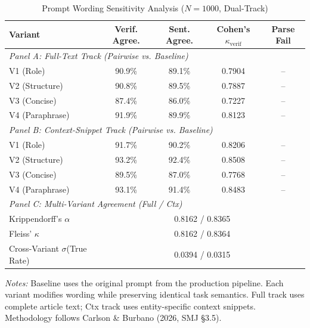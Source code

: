 \begin{table}[htbp]
\centering
\caption{Prompt Wording Sensitivity Analysis ($N=1000$, Dual-Track)}
\label{tab:prompt_sensitivity}
\begin{tabular}{lcccc}
\hline
Variant & Verif. Agree. & Sent. Agree. & Cohen's $\kappa_{\text{verif}}$ & Parse Fail \\
\hline
\multicolumn{5}{l}{\textit{Panel A: Full-Text Track (Pairwise vs. Baseline)}} \\
\quad V1 (Role) & 90.9\% & 89.1\% & 0.7904 & -- \\
\quad V2 (Structure) & 90.8\% & 89.5\% & 0.7887 & -- \\
\quad V3 (Concise) & 87.4\% & 86.0\% & 0.7227 & -- \\
\quad V4 (Paraphrase) & 91.9\% & 89.9\% & 0.8123 & -- \\
\hline
\multicolumn{5}{l}{\textit{Panel B: Context-Snippet Track (Pairwise vs. Baseline)}} \\
\quad V1 (Role) & 91.7\% & 90.2\% & 0.8206 & -- \\
\quad V2 (Structure) & 93.2\% & 92.4\% & 0.8508 & -- \\
\quad V3 (Concise) & 89.5\% & 87.0\% & 0.7768 & -- \\
\quad V4 (Paraphrase) & 93.1\% & 91.4\% & 0.8483 & -- \\
\hline
\multicolumn{5}{l}{\textit{Panel C: Multi-Variant Agreement (Full / Ctx)}} \\
\quad Krippendorff's $\alpha$ & \multicolumn{4}{c}{0.8162 / 0.8365} \\
\quad Fleiss' $\kappa$ & \multicolumn{4}{c}{0.8162 / 0.8364} \\
\quad Cross-Variant $\sigma$(True Rate) & \multicolumn{4}{c}{0.0394 / 0.0315} \\
\hline
\end{tabular}
\par\smallskip\footnotesize
\textit{Notes:} Baseline uses the original prompt from the production pipeline.
Each variant modifies wording while preserving identical task semantics.
Full track uses complete article text; Ctx track uses entity-specific context snippets.
Methodology follows Carlson \& Burbano (2026, SMJ \S3.5).
\end{table}